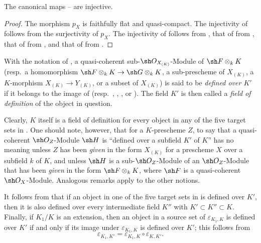 
\begin{proposition}[4.8.3]
\label{IV.4.8.3}
The canonical maps -- are
injective.
\end{proposition}

\begin{proof}
The morphism $p_X$ is faithfully flat and quasi-compact.
The injectivity of  follows from the surjectivity of
$p_X$.
The injectivity of  follows from
, that of  from
, that of  from
, and that of  from
.
\end{proof}

\begin{definition}[4.8.4]
\label{IV.4.8.4}
With the notation of , a quasi-coherent
sub-$\sh O_{X_{(K)}}$-Module of $\sh F\otimes_kK$
(resp.\ a homomorphism
$\sh F\otimes_kK\to\sh G\otimes_kK$, a sub-prescheme of $X_{(K)}$,
a $K$-morphism $X_{(K)}\to Y_{(K)}$, or a subset of $X_{(K)}$)
is said to be \emph{defined over $K'$} if it belongs to the image of
(resp.\ , ,
, or ).
The field $K'$ is then called a \emph{field of definition} of the
object in question.
\end{definition}

Clearly, $K$ itself is a field of definition for every object in any
of the five target sets in .
One should note, however, that for a $K$-prescheme $Z$, to say that a
quasi-coherent $\sh O_Z$-Module $\sh H$ is ``defined over a subfield
$K'$ of $K$'' has no meaning unless $Z$ has been \emph{given} in the
form $X_{(K)}$ for a prescheme $X$ over a subfield $k$ of $K$, and
unless $\sh H$ is a sub-$\sh O_Z$-Module of an $\sh O_Z$-Module that
has been \emph{given} in the form $\sh F\otimes_kK$, where $\sh F$ is
a quasi-coherent $\sh O_X$-Module.
Analogous remarks apply to the other notions.

It follows from  that if an object in one of the
five target sets in  is defined over $K'$, then it is
also defined over every intermediate field $K''$ with
$K'\subset K''\subset K$.
Finally, if $K_1/K$ is an extension, then an object in a source set
of $\varepsilon_{K_1,K}$ is defined over $K'$ if and only if its image under
$\varepsilon_{K_1,K}$ is defined over $K'$; this follows from
\[
\varepsilon_{K_1,K'}=\varepsilon_{K_1,K}\circ\varepsilon_{K,K'}.
\]

